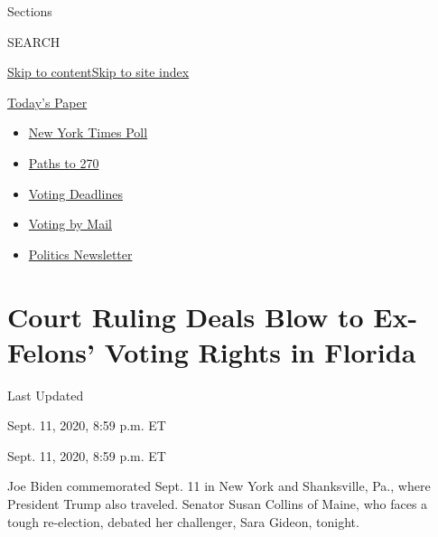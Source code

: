 Sections

SEARCH

\protect\hyperlink{site-content}{Skip to
content}\protect\hyperlink{site-index}{Skip to site index}

\href{https://myaccount.nytimes3xbfgragh.onion/auth/login?response_type=cookie\&client_id=vi}{}

\href{https://www.nytimes3xbfgragh.onion/section/todayspaper}{Today's
Paper}

\begin{itemize}
\item
  \href{https://www.nytimes3xbfgragh.onion/2020/09/12/us/politics/biden-trump-poll-wisconsin-minnesota.html?action=click\&pgtype=Article\&state=default\&region=TOP_BANNER\&context=storylines_menu}{New
  York Times Poll}
\item
  \href{https://www.nytimes3xbfgragh.onion/interactive/2020/us/elections/election-states-biden-trump.html?action=click\&pgtype=Article\&state=default\&region=TOP_BANNER\&context=storylines_menu}{Paths
  to 270}
\item
  \href{https://www.nytimes3xbfgragh.onion/interactive/2019/us/elections/2020-presidential-election-calendar.html?action=click\&pgtype=Article\&state=default\&region=TOP_BANNER\&context=storylines_menu}{Voting
  Deadlines}
\item
  \href{https://www.nytimes3xbfgragh.onion/interactive/2020/08/31/us/politics/vote-by-mail-deadlines.html?action=click\&pgtype=Article\&state=default\&region=TOP_BANNER\&context=storylines_menu}{Voting
  by Mail}
\item
  \href{https://www.nytimes3xbfgragh.onion/newsletters/politics?action=click\&pgtype=Article\&state=default\&region=TOP_BANNER\&context=storylines_menu}{Politics
  Newsletter}
\end{itemize}

\hypertarget{court-ruling-deals-blow-to-ex-felons-voting-rights-in-florida}{%
\section{Court Ruling Deals Blow to Ex-Felons' Voting Rights in
Florida}\label{court-ruling-deals-blow-to-ex-felons-voting-rights-in-florida}}

Last Updated

Sept. 11, 2020, 8:59 p.m. ET

Sept. 11, 2020, 8:59 p.m. ET

Joe Biden commemorated Sept. 11 in New York and Shanksville, Pa., where
President Trump also traveled. Senator Susan Collins of Maine, who faces
a tough re-election, debated her challenger, Sara Gideon, tonight.

